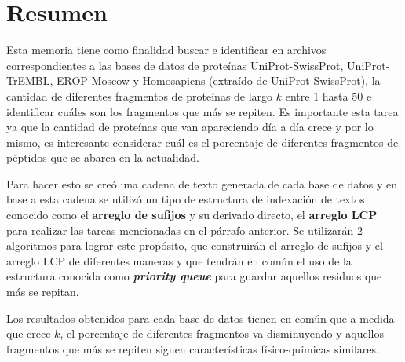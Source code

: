 \chapter*{Resumen}


Esta memoria tiene como finalidad buscar e identificar en archivos correspondientes a las bases de datos de proteínas UniProt-SwissProt, UniProt-TrEMBL, EROP-Moscow y Homosapiens (extraído de UniProt-SwissProt), la cantidad de diferentes fragmentos de proteínas de largo $k$ entre 1 hasta 50 e identificar cuáles son los fragmentos que más se repiten. Es importante esta tarea ya que la cantidad de proteínas que van apareciendo día a día crece y por lo mismo, es interesante considerar cuál es el porcentaje de diferentes fragmentos de péptidos que se abarca en la actualidad.

Para hacer esto se creó una cadena de texto generada de cada base de datos y en base a esta cadena se utilizó un tipo de estructura de indexación de textos conocido como el \textbf{arreglo de sufijos} y su derivado directo, el \textbf{arreglo LCP} para realizar las tareas mencionadas en el párrafo anterior. Se utilizarán 2 algoritmos para lograr este propósito, que construirán el arreglo de sufijos y el arreglo LCP de diferentes maneras y que tendrán en común el uso de la estructura conocida como \textbf{\textit{priority queue}} para guardar aquellos residuos que más se repitan.

Los resultados obtenidos para cada base de datos tienen en común que a medida que crece $k$, el porcentaje de diferentes fragmentos va disminuyendo y aquellos fragmentos que más se repiten siguen características físico-químicas similares.